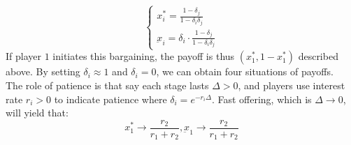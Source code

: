 $$\begin{cases}
    x_i^* = \frac{1 - \delta_j}{1 - \delta_i\delta_j} \\
    \underbar{x}_i = \delta_i \cdot \frac{1 - \delta_j}{1 - \delta_i\delta_j}
\end{cases}$$
If player $1$ initiates this bargaining, the payoff is thus $(x_1^*, 1 - x_1^*)$ described above. By setting $\delta_i \approx 1$ and $\delta_i = 0$, we can obtain four situations of payoffs. \\
The role of patience is that say each stage lasts $\Delta > 0$, and players use interest rate $r_i > 0$ to indicate patience where $\delta_i = e^{-r_i \Delta}$. Fast offering, which is $\Delta \to 0$, will yield that:
$$x_1^* \to \frac{r_2}{r_1 + r_2}, \underbar{x}_1 \to \frac{r_2}{r_1 + r_2}$$


\newpage